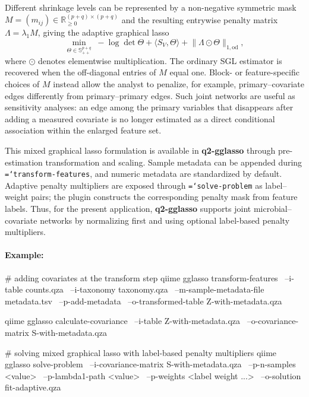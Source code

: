 \documentclass[11pt,a4paper]{article}
\newcommand{\code}[1]{\allowbreak\texttt{\hyphenchar\font=`\-\relax #1}}
\newcommand{\pkg}[1]{\textbf{#1}}
\newcommand{\R}{\mathbb{R}}
\newcommand{\Sp}{\mathbb{S}}
\newcommand{\Th}{\Theta}
\begin{document}
Different shrinkage levels can be represented by a non-negative symmetric mask
$M=(m_{ij})\in\R^{(p+q)\times(p+q)}_{\ge0}$ and the resulting entrywise penalty
matrix $\Lambda=\lambda_1 M$, giving the
adaptive graphical lasso
\begin{equation}
\label{eq:adaptive}
\min_{\Th \in \Sp^{p+q}_{++}} \;
-\log\det \Th + \langle S_V, \Th \rangle
+ \lVert \Lambda \odot \Th \rVert_{1,\mathrm{od}} ,
\end{equation}
where $\odot$ denotes elementwise multiplication. The ordinary SGL estimator is
recovered when the off-diagonal entries of $M$ equal one. Block- or
feature-specific choices of $M$ instead allow
the analyst to penalize, for example, primary--covariate edges differently from
primary--primary edges. Such joint networks are useful as sensitivity analyses:
an edge among the primary variables that disappears after adding a measured
covariate is no longer estimated as a direct conditional association within the
enlarged feature set.

This mixed graphical lasso formulation is available in \pkg{q2-gglasso} through
pre-estimation transformation and scaling. Sample metadata can be appended during
\code{transform-features}, and numeric metadata are standardized by default.
Adaptive penalty multipliers are exposed through \code{solve-problem} as
label--weight pairs; the plugin constructs the corresponding penalty mask from
feature labels. Thus, for the present application, \pkg{q2-gglasso} supports
joint microbial--covariate networks by normalizing first and using optional
label-based penalty multipliers.

\paragraph{Example:} \mbox{}
\begin{PseudoCode}
# adding covariates at the transform step
qiime gglasso transform-features \
    --i-table counts.qza \
    --i-taxonomy taxonomy.qza \
    --m-sample-metadata-file metadata.tsv \
    --p-add-metadata \
    --o-transformed-table Z-with-metadata.qza

qiime gglasso calculate-covariance \
    --i-table Z-with-metadata.qza \
    --o-covariance-matrix S-with-metadata.qza

# solving mixed graphical lasso with label-based penalty multipliers
qiime gglasso solve-problem \
    --i-covariance-matrix S-with-metadata.qza \
    --p-n-samples <value> \
    --p-lambda1-path <value> \
    --p-weights <label weight ...> \
    --o-solution fit-adaptive.qza
\end{PseudoCode}
\end{document}
